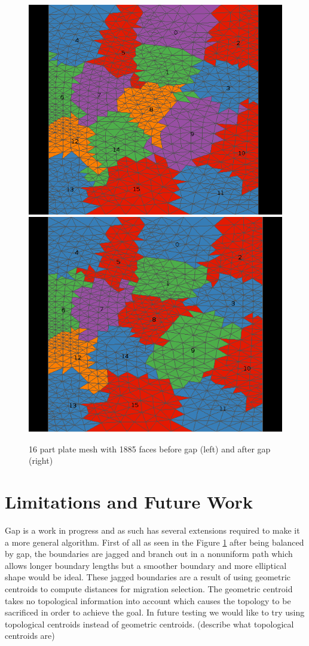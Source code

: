 \documentclass{thesis}
\begin{document}
\begin{figure} [!h]
\centering
\captionsetup{justification=centering,margin=1cm}
\includegraphics[width=.4\textwidth]{before_1885.png}
\includegraphics[width=.4\textwidth]{after_1885.png}
\caption{\label{fig:gap3} \textnormal{16 part plate mesh with 1885 faces before gap (left) and after gap (right)}}
\end{figure}


\chapter{Limitations and Future Work} 


Gap is a work in progress and as such has several extensions required to make 
it a more general algorithm. First of all as seen in the Figure \ref{fig:gap3} after being balanced by gap, the boundaries are jagged and branch out in a nonuniform path which allows longer boundary lengths but a smoother boundary and more elliptical shape would be ideal.  These jagged boundaries are a result of using geometric centroids to compute distances for migration selection. The geometric centroid takes no topological information into account which causes the topology to be sacrificed in order to achieve the goal. In future testing we would like to try using topological centroids instead of geometric centroids. (describe what topological centroids are)
\end{document}
